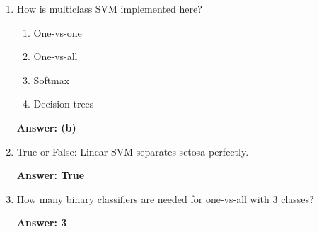 \documentclass[12pt]{article}
\begin{document}
\begin{enumerate}
	\item How is multiclass SVM implemented here?
	\begin{enumerate}
		\item One-vs-one
		\item One-vs-all
		\item Softmax
		\item Decision trees
	\end{enumerate}
	\textbf{Answer: (b)}
	
	\item True or False: Linear SVM separates setosa perfectly.
	
	\textbf{Answer: True}
	
	\item How many binary classifiers are needed for one-vs-all with 3 classes?
	
	\textbf{Answer: 3}
\end{enumerate}
\end{document}
